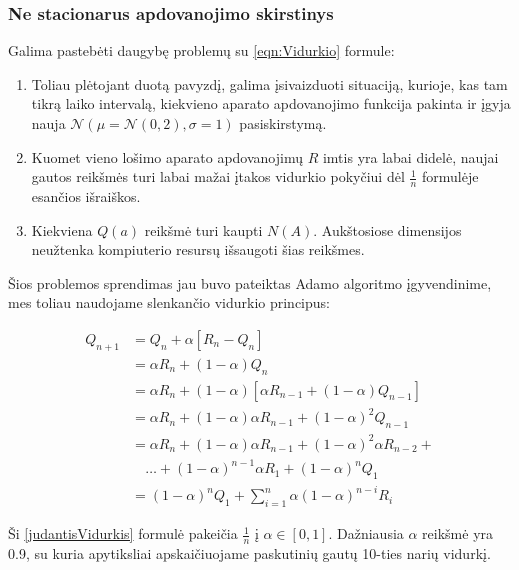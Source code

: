 \documentclass[a4paper, 12pt]{article}
\begin{document}
%
\subsubsection{Ne stacionarus apdovanojimo skirstinys}
%

Galima pastebėti daugybę problemų su \ref{eqn:Vidurkio} formule:

\begin{enumerate}
  \addtolength{\itemsep}{-0.5\baselineskip} 
  \item Toliau plėtojant duotą pavyzdį, galima įsivaizduoti situaciją, kurioje, kas tam tikrą laiko intervalą, kiekvieno aparato apdovanojimo funkcija pakinta ir įgyja nauja $\mathcal{N}(\mu=\mathcal{N}(0,2),\sigma=1)$ pasiskirstymą.
  \item Kuomet vieno lošimo aparato apdovanojimų $R$ imtis yra labai didelė, naujai gautos reikšmės turi labai mažai įtakos vidurkio pokyčiui dėl $\frac{1}{n}$ formulėje esančios išraiškos.
  \item Kiekviena $Q(a)$ reikšmė turi kaupti $N(A)$. Aukštosiose dimensijos neužtenka kompiuterio resursų išsaugoti šias reikšmes.
\end{enumerate}

Šios problemos sprendimas jau buvo pateiktas Adamo algoritmo įgyvendinime, mes toliau naudojame slenkančio vidurkio principus:

\begin{equation}
\label{judantisVidurkis}
\begin{aligned}
Q_{n+1} &=Q_{n}+\alpha\left[R_{n}-Q_{n}\right] \\
&=\alpha R_{n}+(1-\alpha) Q_{n} \\
&=\alpha R_{n}+(1-\alpha)\left[\alpha R_{n-1}+(1-\alpha) Q_{n-1}\right] \\
&=\alpha R_{n}+(1-\alpha) \alpha R_{n-1}+(1-\alpha)^{2} Q_{n-1} \\
&=\alpha R_{n}+(1-\alpha) \alpha R_{n-1}+(1-\alpha)^{2} \alpha R_{n-2}+\\
& \quad \ldots+(1-\alpha)^{n-1} \alpha R_{1}+(1-\alpha)^{n} Q_{1} \\
&=(1-\alpha)^{n} Q_{1}+\sum_{i=1}^{n} \alpha(1-\alpha)^{n-i} R_{i}
\end{aligned}
\end{equation}

Ši \ref{judantisVidurkis} formulė pakeičia $\frac{1}{n}$ į $\alpha \in [0,1]$. Dažniausia $\alpha$ reikšmė yra 0.9, su kuria apytiksliai apskaičiuojame paskutinių gautų 10-ties narių vidurkį.
\end{document}
